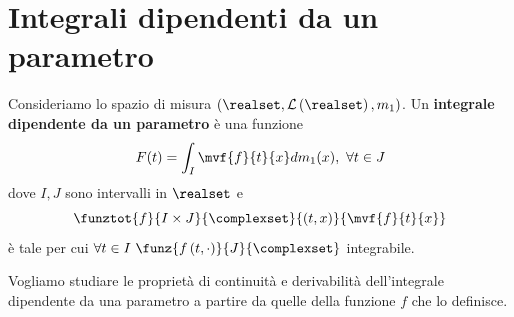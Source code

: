\section{Integrali dipendenti da un parametro}
\begin{define}
	Consideriamo lo spazio di misura $\left(\realset,\mathcal{L}\left(\realset\right),m_1\right)$. Un \textbf{integrale dipendente da un parametro} è una funzione
	\begin{equation}
		F(t)=\int_I\mvf{f}{t}{x}dm_1(x),\ \forall t\in J
	\end{equation}
	dove $I,J$ sono intervalli in $\realset$ e
	\begin{equation*}
		\funztot{f}{I\times J}{\complexset}{\left(t,x\right)}{\mvf{f}{t}{x}}
	\end{equation*}
	è tale per cui $\forall t\in I\ \funz{f\left(t,\cdot\right)}{J}{\complexset}$ integrabile.
\end{define}
Vogliamo studiare le proprietà di continuità e derivabilità dell'integrale dipendente da una parametro a partire da quelle della funzione $f$ che lo definisce.
